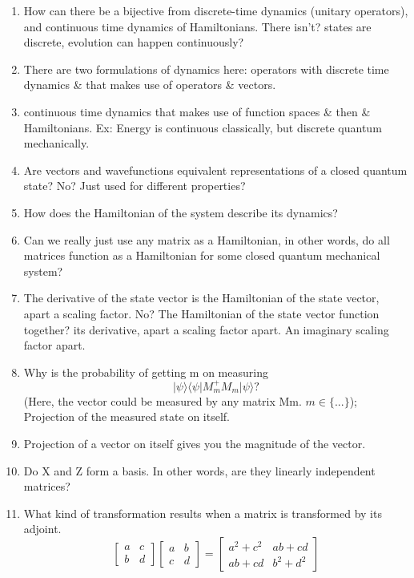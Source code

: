 \documentclass{article}
\begin{document}
\begin{enumerate}
\begin{enumerate}
	\item How can there be a bijective from discrete-time dynamics (unitary operators), and continuous time dynamics of Hamiltonians. There isn't? states are discrete, evolution can happen continuously? 

	\item There are two formulations of dynamics here: operators with discrete time dynamics \& that makes use of operators \& vectors. 

	\item continuous time dynamics that makes use of function spaces \& then \& Hamiltonians. Ex: Energy is continuous classically, but discrete quantum mechanically.

	\item Are vectors and wavefunctions equivalent representations of a closed quantum state? No? Just used for different properties?

	\item How does the Hamiltonian of the system describe its dynamics?

	\item Can we really just use any matrix as a Hamiltonian, in other words, do all matrices function as a Hamiltonian for some closed quantum mechanical system?

	\item The derivative of the state vector is the Hamiltonian of the state vector, apart a scaling factor. No? The Hamiltonian of the state vector function together? its derivative, apart a scaling factor apart. An imaginary scaling factor apart. 

	\item Why is the probability of getting m on measuring 
    $$|\psi\rangle \langle \psi | M_m^+ M_m | \psi \rangle?$$ (Here, the vector could be measured by any matrix Mm. $m \in \{...\}$); Projection of the measured state on itself. 
    \item Projection of a vector on itself gives you the magnitude of the vector. 

	\item Do X and Z form a basis. In other words, are they linearly independent matrices?

    \item What kind of transformation results when a matrix is transformed by its adjoint. 
$$\left[ \begin{array}{cc} a & c \\ b & d \end{array} \right] \left[ \begin{array}{cc} a & b \\ c & d \end{array} \right] = \left[ \begin{array}{cc} a^2+c^2 & ab+cd \\ ab+cd & b^2+d^2 \end{array} \right] $$ 
        

\end{enumerate}
\end{enumerate}
\end{document}
